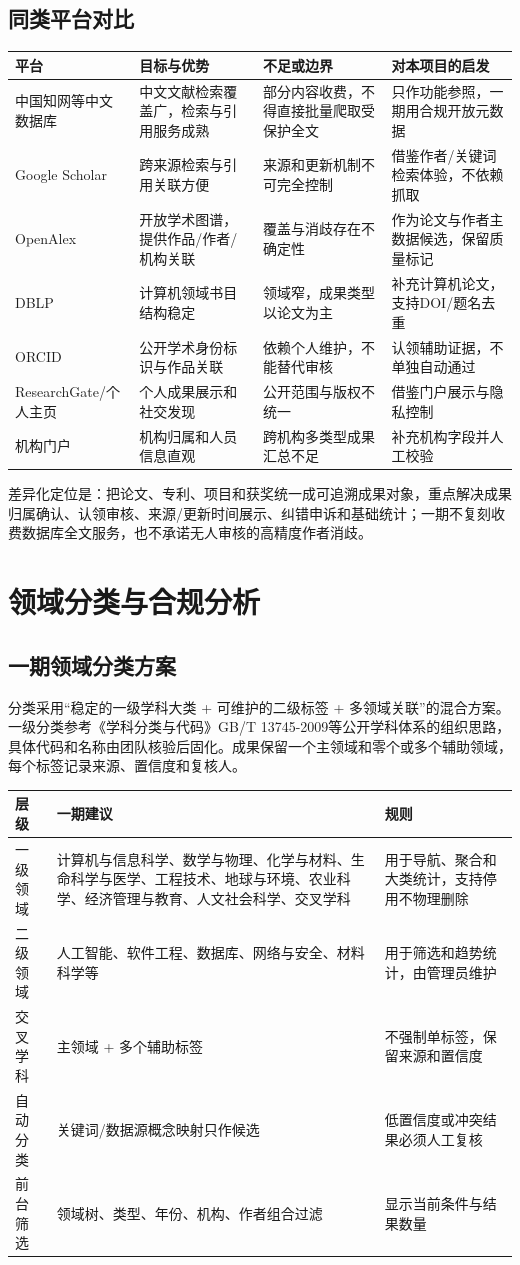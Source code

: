 \documentclass[UTF8,11pt,a4paper]{ctexart}
\begin{document}
\subsection{同类平台对比}
\begin{longtable}{p{2.4cm}p{4.2cm}p{4.2cm}p{4.0cm}}
\toprule 平台 & 目标与优势 & 不足或边界 & 对本项目的启发\\\midrule
中国知网等中文数据库 & 中文文献检索覆盖广，检索与引用服务成熟 & 部分内容收费，不得直接批量爬取受保护全文 & 只作功能参照，一期用合规开放元数据\\
Google Scholar & 跨来源检索与引用关联方便 & 来源和更新机制不可完全控制 & 借鉴作者/关键词检索体验，不依赖抓取\\
OpenAlex & 开放学术图谱，提供作品/作者/机构关联 & 覆盖与消歧存在不确定性 & 作为论文与作者主数据候选，保留质量标记\\
DBLP & 计算机领域书目结构稳定 & 领域窄，成果类型以论文为主 & 补充计算机论文，支持DOI/题名去重\\
ORCID & 公开学术身份标识与作品关联 & 依赖个人维护，不能替代审核 & 认领辅助证据，不单独自动通过\\
ResearchGate/个人主页 & 个人成果展示和社交发现 & 公开范围与版权不统一 & 借鉴门户展示与隐私控制\\
机构门户 & 机构归属和人员信息直观 & 跨机构多类型成果汇总不足 & 补充机构字段并人工校验\\\bottomrule
\end{longtable}
差异化定位是：把论文、专利、项目和获奖统一成可追溯成果对象，重点解决成果归属确认、认领审核、来源/更新时间展示、纠错申诉和基础统计；一期不复刻收费数据库全文服务，也不承诺无人审核的高精度作者消歧。

\section{领域分类与合规分析}
\subsection{一期领域分类方案}
分类采用“稳定的一级学科大类 + 可维护的二级标签 + 多领域关联”的混合方案。一级分类参考《学科分类与代码》GB/T 13745-2009等公开学科体系的组织思路，具体代码和名称由团队核验后固化。成果保留一个主领域和零个或多个辅助领域，每个标签记录来源、置信度和复核人。

\begin{longtable}{p{2.1cm}p{7.2cm}p{5.2cm}}
\toprule 层级 & 一期建议 & 规则\\\midrule
一级领域 & 计算机与信息科学、数学与物理、化学与材料、生命科学与医学、工程技术、地球与环境、农业科学、经济管理与教育、人文社会科学、交叉学科 & 用于导航、聚合和大类统计，支持停用不物理删除\\
二级领域 & 人工智能、软件工程、数据库、网络与安全、材料科学等 & 用于筛选和趋势统计，由管理员维护\\
交叉学科 & 主领域 + 多个辅助标签 & 不强制单标签，保留来源和置信度\\
自动分类 & 关键词/数据源概念映射只作候选 & 低置信度或冲突结果必须人工复核\\
前台筛选 & 领域树、类型、年份、机构、作者组合过滤 & 显示当前条件与结果数量\\\bottomrule
\end{longtable}
\end{document}
